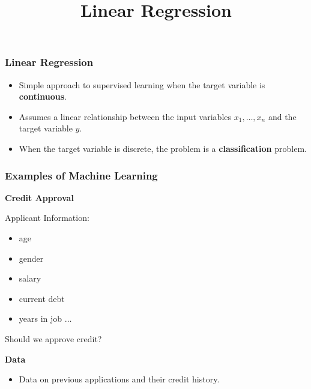 \documentclass[xcolor=table]{beamer}
\title{Linear Regression}
\begin{document}
\maketitle

\begin{frame}[t]
  \frametitle{Linear Regression}  
\begin{itemize}
    \item Simple approach to supervised learning when the target variable is 
        \textbf{continuous}.
    \item Assumes a linear relationship between the input variables 
        $x_1, \ldots, x_n$ and the target variable $y$.
    \item  When the target variable is discrete, the problem is a
    \textbf{classification}
        problem. 
  \end{itemize}
\end{frame}

\begin{frame}[t]
\frametitle{Examples of Machine Learning}
\textcolor{orange2}{\textbf{Credit Approval}}

Applicant Information:

\begin{itemize}
    \item age
    \item gender
    \item salary
    \item current debt
    \item years in job $\ldots$ 
\end{itemize}

\pause

Should we approve credit? 

\bigskip

\textbf{Data}
\begin{itemize}
    \item Data on previous applications and their credit history.
\end{itemize}
\end{frame}
\end{document}
